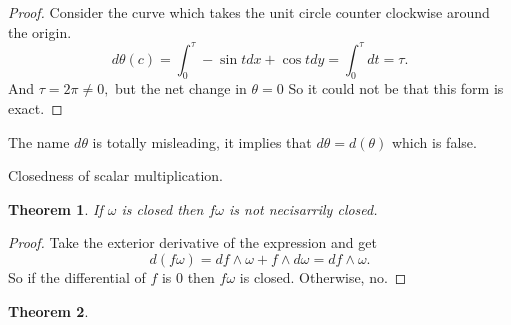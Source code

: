 \documentclass[letter]{article}
\newtheorem{theorem}{Theorem}
\newenvironment{menumerate}{%
  \edef\backupindent{\the\parindent}%
  \enumerate%
  \setlength{\parindent}{\backupindent}%
}{\endenumerate}
\begin{document}
\begin{menumerate}
\begin{proof}
	Consider the curve which takes the unit circle counter clockwise around the origin. 
	\begin{equation}
	 d\theta(c)= \int_0^\tau -\sin t dx + \cos t dy = \int_0^\tau dt = \tau.
	\end{equation}
	And $\tau = 2\pi \neq 0,$ but the net change in $\theta = 0$ So it could not be that this form is exact. 
\end{proof}
	The name $d\theta$ is totally misleading, it implies that $d\theta = d(\theta)$ which is false. 
	\setcounter{enumi}{67}
	\item Closedness of scalar multiplication.
	 \begin{theorem}
		If $\omega$ is closed then $f\omega$ is not necisarrily closed.	
	\end{theorem}
	\begin{proof}
		Take the exterior derivative of the expression and get
		\begin{equation}
		d(f\omega) = df \wedge \omega + f \wedge d\omega = df \wedge \omega.
		\end{equation}
		So if the differential of $f$ is $0$ then $f\omega$ is closed. Otherwise, no.
	\end{proof}
	\begin{theorem}
		
	\end{theorem}


\end{menumerate}
\end{document}
